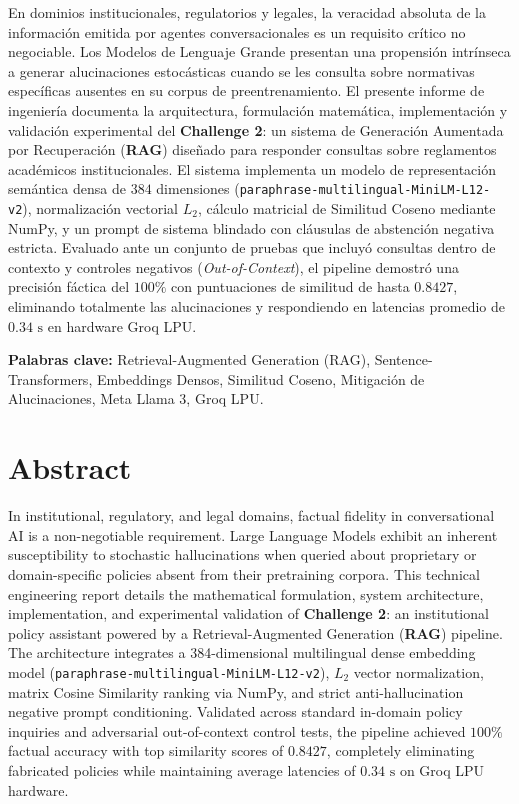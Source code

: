 \documentclass[12pt,letterpaper]{article}
\begin{document}
En dominios institucionales, regulatorios y legales, la veracidad absoluta de la información emitida por agentes conversacionales es un requisito crítico no negociable. Los Modelos de Lenguaje Grande presentan una propensión intrínseca a generar alucinaciones estocásticas cuando se les consulta sobre normativas específicas ausentes en su corpus de preentrenamiento. El presente informe de ingeniería documenta la arquitectura, formulación matemática, implementación y validación experimental del \textbf{Challenge 2}: un sistema de Generación Aumentada por Recuperación (\textbf{RAG}) diseñado para responder consultas sobre reglamentos académicos institucionales. El sistema implementa un modelo de representación semántica densa de $384$ dimensiones (\texttt{paraphrase-multilingual-MiniLM-L12-v2}), normalización vectorial $L_2$, cálculo matricial de Similitud Coseno mediante NumPy, y un prompt de sistema blindado con cláusulas de abstención negativa estricta. Evaluado ante un conjunto de pruebas que incluyó consultas dentro de contexto y controles negativos (\textit{Out-of-Context}), el pipeline demostró una precisión fáctica del $100\%$ con puntuaciones de similitud de hasta $0.8427$, eliminando totalmente las alucinaciones y respondiendo en latencias promedio de $0.34\text{ s}$ en hardware Groq LPU.

\vspace{0.5cm}
\noindent\textbf{Palabras clave:} Retrieval-Augmented Generation (RAG), Sentence-Transformers, Embeddings Densos, Similitud Coseno, Mitigación de Alucinaciones, Meta Llama 3, Groq LPU.

\vspace{1cm}

\section*{Abstract}

In institutional, regulatory, and legal domains, factual fidelity in conversational AI is a non-negotiable requirement. Large Language Models exhibit an inherent susceptibility to stochastic hallucinations when queried about proprietary or domain-specific policies absent from their pretraining corpora. This technical engineering report details the mathematical formulation, system architecture, implementation, and experimental validation of \textbf{Challenge 2}: an institutional policy assistant powered by a Retrieval-Augmented Generation (\textbf{RAG}) pipeline. The architecture integrates a 384-dimensional multilingual dense embedding model (\texttt{paraphrase-multilingual-MiniLM-L12-v2}), $L_2$ vector normalization, matrix Cosine Similarity ranking via NumPy, and strict anti-hallucination negative prompt conditioning. Validated across standard in-domain policy inquiries and adversarial out-of-context control tests, the pipeline achieved $100\%$ factual accuracy with top similarity scores of $0.8427$, completely eliminating fabricated policies while maintaining average latencies of $0.34\text{ s}$ on Groq LPU hardware.
\end{document}
